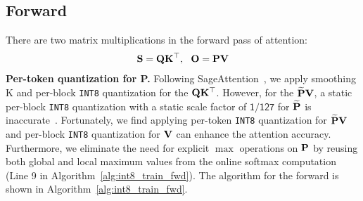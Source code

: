 \subsection{Forward}
There are two matrix multiplications in the forward pass of attention:
\begin{align}
    \mathbf{S} = \mathbf{Q}\mathbf{K}^\top,~~ \mathbf{O} = \mathbf{P} \mathbf{V}
\end{align}
\textbf{Per-token quantization for P.} Following SageAttention~\citep{2024sageattention}, we apply smoothing K and per-block \texttt{INT8} quantization for the $\mathbf{Q}\mathbf{K}^\top$. However, for the $\widetilde {\mathbf{P}} \mathbf{V}$, a static per-block \texttt{INT8} quantization with a static scale factor of $\mathsf{1/127}$ for $\widetilde {\mathbf{P}}$ is inaccurate~\citep{2024sageattention}. Fortunately, we find applying per-token \texttt{INT8} quantization for $\widetilde {\mathbf{P}} \mathbf{V}$ and per-block \texttt{INT8} quantization for $\mathbf{V}$ can enhance the attention accuracy. 
Furthermore, we eliminate the need for explicit $\max$ operations on $\mathbf{P}$ by reusing both global and local maximum values from the online softmax computation (Line 9 in Algorithm~\ref{alg:int8_train_fwd}).
The algorithm for the forward is shown in Algorithm~\ref{alg:int8_train_fwd}.


